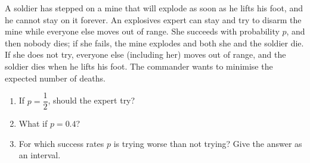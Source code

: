 A soldier has stepped on a mine that will explode as soon as he lifts his foot, and he cannot stay on it forever. An explosives expert can stay and try to disarm the mine while everyone else moves out of range. She succeeds with probability $p$, and then nobody dies; if she fails, the mine explodes and both she and the soldier die. If she does not try, everyone else (including her) moves out of range, and the soldier dies when he lifts his foot. The commander wants to minimise the expected number of deaths.
\begin{enumerate}
\item[(a)] If $p=\dfrac12$, should the expert try?
\item[(b)] What if $p=0.4$?
\item[(c)] For which success rates $p$ is trying worse than not trying? Give the answer as an interval.
\end{enumerate}
